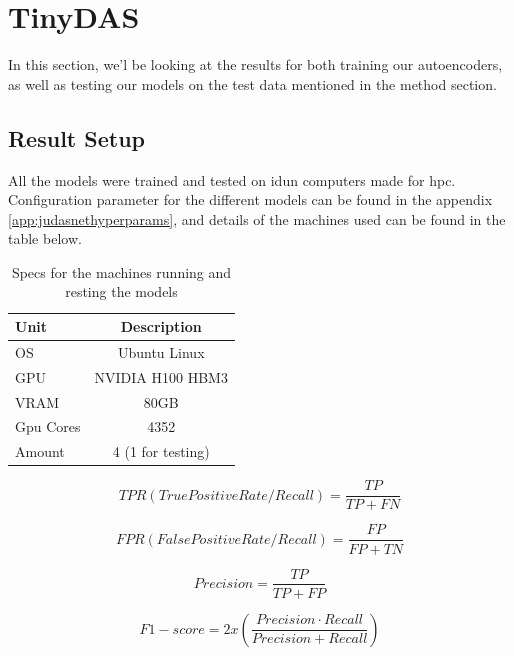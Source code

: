 \section{TinyDAS}
\label{res:tinydas}

In this section, we'l be looking at the results for both training our autoencoders, as well as testing our models on the test data mentioned in the method section.

\subsection{Result Setup}

All the models were trained and tested on \gls{idun} computers made for \acrshort{hpc}. Configuration parameter for the different models can be found in the appendix \ref{app:judasnethyperparams}, and details of the machines used can be found in the table below. \\



\begin{table}[h]
\centering
\begin{tabular}{|l|c|}
\hline
\textbf{Unit} & \textbf{Description}         \\ \hline
OS            & Ubuntu Linux          \\ \hline
GPU           & NVIDIA H100 HBM3     \\ \hline
VRAM          & 80GB                  \\ \hline
Gpu Cores     & 4352                  \\ \hline
Amount        & 4 (1 for testing)     \\ \hline
\end{tabular}
\label{tab:specs}
\caption{Specs for the machines running and resting the models}
\end{table}

\begin{equation}
    TPR(TruePositiveRate/Recall) = \frac{TP}{TP + FN}
\end{equation}

\begin{equation}
    FPR(FalsePositiveRate/Recall) = \frac{FP}{FP + TN}
\end{equation}

\begin{equation}
    Precision = \frac{TP}{TP + FP}
\end{equation}

\begin{equation}
    F1 - score = 2 x (\frac{Precision \cdot Recall}{Precision + Recall})
\end{equation}

